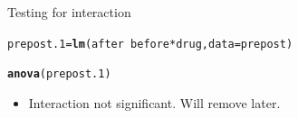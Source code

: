 \documentclass[unknownkeysallowed]{beamer}\usepackage[]{graphicx}\usepackage[]{color}
\makeatletter
\newcommand{\hlopt}[1]{\textcolor[rgb]{0,0,0}{#1}}%
\newcommand{\hlstd}[1]{\textcolor[rgb]{0.345,0.345,0.345}{#1}}%
\newcommand{\hlkwb}[1]{\textcolor[rgb]{0.69,0.353,0.396}{#1}}%
\newcommand{\hlkwc}[1]{\textcolor[rgb]{0.333,0.667,0.333}{#1}}%
\newcommand{\hlkwd}[1]{\textcolor[rgb]{0.737,0.353,0.396}{\textbf{#1}}}%
\newenvironment{kframe}{%
 \def\at@end@of@kframe{}%
 \ifinner\ifhmode%
  \def\at@end@of@kframe{\end{minipage}}%
  \begin{minipage}{\columnwidth}%
 \fi\fi%
 \def\FrameCommand##1{\hskip\@totalleftmargin \hskip-\fboxsep
 \colorbox{shadecolor}{##1}\hskip-\fboxsep
     \hskip-\linewidth \hskip-\@totalleftmargin \hskip\columnwidth}%
 \MakeFramed {\advance\hsize-\width
   \@totalleftmargin\z@ \linewidth\hsize
   \@setminipage}}%
 {\par\unskip\endMakeFramed%
 \at@end@of@kframe}
\newenvironment{knitrout}{}{} %
\makeatother
\begin{document}
\begin{frame}[fragile]{Testing for interaction}

 
\begin{knitrout}
\color{fgcolor}\begin{kframe}
\begin{alltt}
\hlstd{prepost.1}\hlkwb{=}\hlkwd{lm}\hlstd{(after}\hlopt{~}\hlstd{before}\hlopt{*}\hlstd{drug,}\hlkwc{data}\hlstd{=prepost)}
\end{alltt}


{\ttfamily\noindent\bfseries\color{errorcolor}{\#\# Error in is.data.frame(data): object 'prepost' not found}}\begin{alltt}
\hlkwd{anova}\hlstd{(prepost.1)}
\end{alltt}


{\ttfamily\noindent\bfseries\color{errorcolor}{\#\# Error in anova(prepost.1): object 'prepost.1' not found}}\end{kframe}
\end{knitrout}


\begin{itemize}
\item Interaction not significant. Will remove later.
\end{itemize}
\end{frame}
\end{document}

